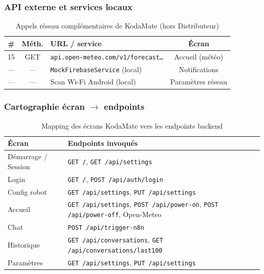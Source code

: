 \documentclass[a4paper,12pt]{report}
\begin{document}
	\subsubsection{API externe et services locaux}
	
	\begin{table}[htbp]
		\centering
		\caption{Appels réseau complémentaires de KodaMate (hors Distributeur)}
		\label{tab:ch4-endpoints-externes}
		\small
		\renewcommand{\arraystretch}{1.2}
		\begin{tabularx}{\textwidth}{|c|c|>{\raggedright\arraybackslash}X|c|}
			\hline
			\textbf{\#} & \textbf{Méth.} & \textbf{URL / service} & \textbf{Écran} \\
			\hline
			15 & GET & \texttt{api.open-meteo.com/v1/forecast\ldots} & Accueil (météo) \\
			\hline
			--- & --- & \texttt{MockFirebaseService} (local) & Notifications \\
			--- & --- & Scan Wi-Fi Android (local) & Paramètres réseau \\
			\hline
		\end{tabularx}
	\end{table}
	
	\subsubsection{Cartographie écran $\rightarrow$ endpoints}
	
	\begin{table}[htbp]
		\centering
		\caption{Mapping des écrans KodaMate vers les endpoints backend}
		\label{tab:ch4-endpoints-mapping}
		\small
		\renewcommand{\arraystretch}{1.25}
		\begin{tabularx}{\textwidth}{|>{\raggedright\arraybackslash}p{3.2cm}|>{\raggedright\arraybackslash}X|}
			\hline
			\textbf{Écran} & \textbf{Endpoints invoqués} \\
			\hline
			Démarrage / Session &
			\texttt{GET /}, \texttt{GET /api/settings} \\
			Login &
			\texttt{GET /}, \texttt{POST /api/auth/login} \\
			Config robot &
			\texttt{GET /api/settings}, \texttt{PUT /api/settings} \\
			Accueil &
			\texttt{GET /api/settings}, \texttt{POST /api/power-on}, \texttt{POST /api/power-off}, Open-Meteo \\
			Chat &
			\texttt{POST /api/trigger-n8n} \\
			Historique &
			\texttt{GET /api/conversations}, \texttt{GET /api/conversations/last100} \\
			Paramètres &
			\texttt{GET /api/settings}, \texttt{PUT /api/settings} \\
			\hline
		\end{tabularx}
	\end{table}
	
\end{document}
